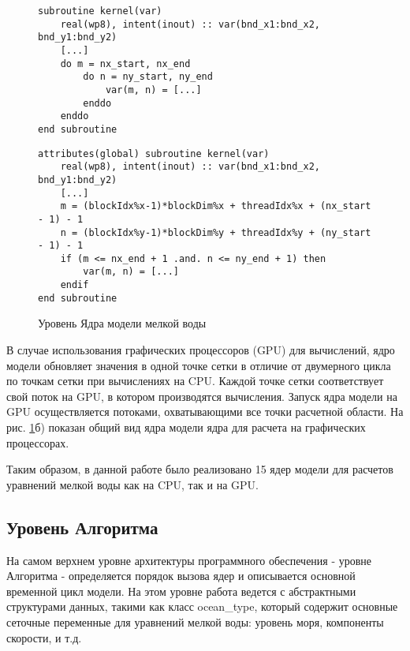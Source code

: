 \begin{figure}[!ht]
	\begin{minipage}{\linewidth}
		\centering
		\begin{lstlisting}
subroutine kernel(var)
	real(wp8), intent(inout) :: var(bnd_x1:bnd_x2, bnd_y1:bnd_y2)
	[...]
	do m = nx_start, nx_end
		do n = ny_start, ny_end
			var(m, n) = [...]
		enddo
	enddo
end subroutine
		\end{lstlisting}
	\end{minipage}
	\begin{minipage}{\linewidth}
		\centering
		\begin{lstlisting}
attributes(global) subroutine kernel(var)
	real(wp8), intent(inout) :: var(bnd_x1:bnd_x2, bnd_y1:bnd_y2)
	[...]
	m = (blockIdx%x-1)*blockDim%x + threadIdx%x + (nx_start - 1) - 1
	n = (blockIdx%y-1)*blockDim%y + threadIdx%y + (ny_start - 1) - 1
	if (m <= nx_end + 1 .and. n <= ny_end + 1) then
		var(m, n) = [...]
	endif
end subroutine
		\end{lstlisting}
	\end{minipage}
	\vspace{3pt}
	\caption{Уровень Ядра модели мелкой воды}
	\label{fig:kernel}
\end{figure}

В случае использования графических процессоров (GPU) для вычислений, ядро модели обновляет значения в одной точке сетки в отличие от двумерного цикла по точкам сетки при вычислениях на CPU.
Каждой точке сетки соответствует свой поток на GPU, в котором производятся вычисления.
Запуск ядра модели на GPU осуществляется потоками, охватывающими все точки расчетной области. На рис. \ref{fig:kernel}б) показан общий вид ядра модели ядра для расчета на графических процессорах.

Таким образом, в данной работе было реализовано 15 ядер модели для расчетов уравнений мелкой воды как на CPU, так и на GPU.

\subsection{Уровень Алгоритма}

На самом верхнем уровне архитектуры программного обеспечения - уровне Алгоритма - определяется порядок вызова ядер и описывается основной временной цикл модели. На этом уровне работа ведется с абстрактными структурами данных, такими как класс ocean\_type, который содержит основные сеточные переменные для уравнений мелкой воды: уровень моря, компоненты скорости, и т.д.

